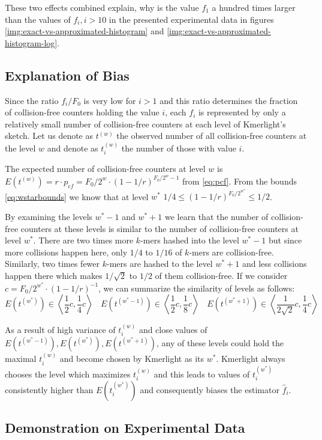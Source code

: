 These two effects combined explain, why is the value $f_1$ a hundred times larger than
the values of $f_i, i>10$ in the presented experimental data in figures
\ref{img:exact-vs-approximated-histogram} and \ref{img:exact-vs-approximated-histogram-log}.

\subsection{Explanation of Bias}
Since the ratio $f_i / F_0$ is very low for $i>1$ and this ratio determines
the fraction of collision-free counters holding the value $i$, each $f_i$ is
represented by only a relatively small number of collision-free counters at each level of 
Kmerlight's sketch. Let us denote as $t^{(w)}$ the observed number of all collision-free
counters at the level $w$ and denote as $t_i^{(w)}$ the number of those with value $i$.

The expected number of collision-free counters at level $w$ is 
$E(t^{(w)}) = r \cdot p_{cf} = F_0 / 2^w \cdot (1 - 1/r)^{F_0/2^w - 1}$ from \ref{eq:pcf}.
From the bounds \ref{eq:wstarbounds} we know that at level $w^*$
$1/4 \leq (1 - 1/r)^{F_0/2^{w^*}} \leq 1/2$.

By examining the levels $w^*-1$ and $w^*+1$ we learn that the number of collision-free
counters at these levels is similar to the number of collision-free counters at level $w^*$. 
There are two times more $k$-mers hashed into the level $w^*-1$ but since more collisions
happen here, only $1/4$ to $1/16$ of $k$-mers are collision-free. Similarly, two times fewer
$k$-mers are hashed to the level $w^*+1$ and less collisions happen there which makes 
$1/\sqrt{2}$ to $1/2$ of them collision-free. If we consider $c = F_0/2^{w^*} \cdot (1-1/r)^{-1}$,
we can summarize the similarity of levels as follows:
$$E(t^{(w^*)}) \in \left\langle \frac{1}{2}c, \frac{1}{4}c  \right\rangle ~~~~
E(t^{(w^*-1)}) \in \left\langle \frac{1}{2}c, \frac{1}{8}c  \right\rangle ~~~~
E(t^{(w^*+1)}) \in \left\langle \frac{1}{2\sqrt{2}}c, \frac{1}{4}c  \right\rangle
$$

As a result of high variance of $t_i^{(w)}$ and close values of $E(t^{(w^*-1)}), 
E(t^{(w^*)}),E(t^{(w^*+1)})$, any of these levels could hold the maximal $t_i^{(w)}$ 
and become chosen by Kmerlight as its $w^*$. Kmerlight always chooses the level which 
maximizes $t_i^{(w)}$ and this leads to values of $t_i^{(w^*)}$ consistently higher
than $E(t_i^{(w^*)})$ and consequently biases the estimator $\hat f_i$.

\subsection{Demonstration on Experimental Data}

